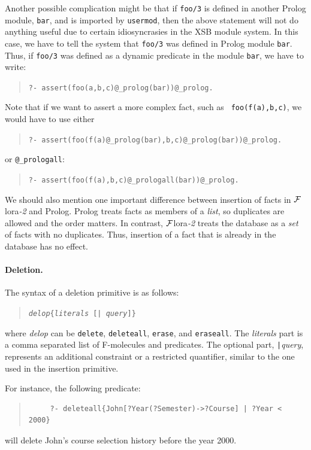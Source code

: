 \documentclass[11pt]{article}
\newcommand{\FLORA}{{\mbox{\sc ${\cal F}${lora}\rm\emph{-2}}}\xspace}
\begin{document}
Another possible complication might be that
if {\tt foo/3} is defined in another Prolog module, {\tt bar}, and
is imported by {\tt usermod}, then the above statement will not do anything
useful due to certain idiosyncrasies in the XSB module system. In this
case, we have to tell the system that {\tt foo/3} was defined in Prolog
module {\tt bar}.  Thus, if
{\tt foo/3} was defined as a dynamic predicate in the module
  {\tt bar}, we have to write:
\begin{quote}
 {\tt ?- assert(foo(a,b,c)@\_prolog(bar))@\_prolog.  }  
\end{quote}
Note that if we want to assert a more complex fact, such as {\tt
  foo(f(a),b,c)}, we would have to use either
\begin{quote}
 {\tt ?- assert(foo(f(a)@\_prolog(bar),b,c)@\_prolog(bar))@\_prolog.}  
\end{quote}
or {\tt @\_prologall}:
\begin{quote}
 {\tt ?- assert(foo(f(a),b,c)@\_prologall(bar))@\_prolog.}  
\end{quote}

We should also mention one important difference between insertion of facts
in \FLORA and Prolog. Prolog treats facts as members of a \emph{list}, so
duplicates are allowed and the order matters. In contrast, \FLORA treats
the database as a \emph{set} of facts with no duplicates. Thus, insertion
of a fact that is already in the database has no effect.


%
\paragraph{Deletion.} The syntax of a deletion primitive is as follows:
\begin{quote}
{\tt \emph{delop}\{\emph{literals} [| \emph{query}]\}}
\end{quote}
where {\it delop} can be {\tt delete}, {\tt deleteall}, {\tt erase}, and
{\tt eraseall}. The {\it literals} part is a comma separated list of
F-molecules and predicates. The optional part, {\tt |}\emph{query},
represents an additional constraint or a restricted quantifier, similar
to the one used in the insertion primitive.

For instance, the following predicate:
\begin{quote}
\begin{verbatim}
     ?- deleteall{John[?Year(?Semester)->?Course] | ?Year < 2000}
\end{verbatim}
\end{quote}
will delete John's course selection history before the year 2000.
\end{document}
